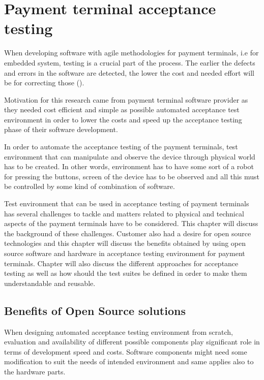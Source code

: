 
\chapter{Payment terminal acceptance testing}
\label{chapter:Payment terminal acceptance testing} 

When developing software with agile methodologies for payment terminals, i.e for embedded system, testing is a crucial part of the process. The earlier the defects and errors in the software are detected, the lower the cost and needed effort will be for correcting those (\emph{\cite{myers2011art}}).

Motivation for this research came from payment terminal software provider as they needed cost efficient and simple as possible automated acceptance test environment in order to lower the costs and speed up the acceptance testing phase of their software development.

In order to automate the acceptance testing of the payment terminals, test environment that can manipulate and observe the device through physical world has to be created. In other words, environment has to have some sort of a robot for pressing the buttons, screen of the device has to be observed and all this must be controlled by some kind of combination of software.

Test environment that can be used in acceptance testing of payment terminals has several challenges to tackle and matters related to physical and technical aspects of the payment terminals have to be considered. This chapter will discuss the background of these challenges. Customer also had a desire for open source technologies and this chapter will discuss the benefits obtained by using open source software and hardware in acceptance testing environment for payment terminals. Chapter will also discuss the different approaches for acceptance testing as well as how should the test suites be defined in order to make them understandable and reusable.

\section{Benefits of Open Source solutions}
\label{section:Open source}

When designing automated acceptance testing environment from scratch, evaluation and availability of different possible components play significant role in terms of development speed and costs. Software components might need some modification to suit the needs of intended environment and same applies also to the hardware parts.

